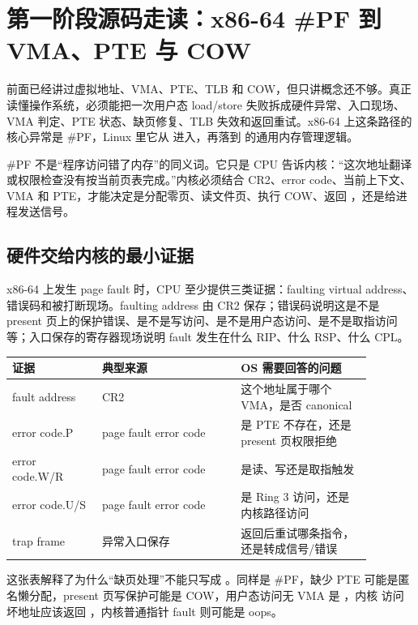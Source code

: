 \section{第一阶段源码走读：x86-64 \#PF 到 VMA、PTE 与 COW}

前面已经讲过虚拟地址、VMA、PTE、TLB 和 COW，但只讲概念还不够。真正读懂操作系统，必须能把一次用户态 load/store 失败拆成硬件异常、入口现场、VMA 判定、PTE 状态、缺页修复、TLB 失效和返回重试。x86-64 上这条路径的核心异常是 \#PF，Linux 里它从  进入，再落到  的通用内存管理逻辑。

\begin{keyidea}
\#PF 不是“程序访问错了内存”的同义词。它只是 CPU 告诉内核：“这次地址翻译或权限检查没有按当前页表完成。”内核必须结合 CR2、error code、当前上下文、VMA 和 PTE，才能决定是分配零页、读文件页、执行 COW、返回 ，还是给进程发送信号。
\end{keyidea}

\subsection{硬件交给内核的最小证据}

x86-64 上发生 page fault 时，CPU 至少提供三类证据：faulting virtual address、错误码和被打断现场。faulting address 由 CR2 保存；错误码说明这是不是 present 页上的保护错误、是不是写访问、是不是用户态访问、是不是取指访问等；入口保存的寄存器现场说明 fault 发生在什么 RIP、什么 RSP、什么 CPL。

\begin{longtable}{|p{0.22\linewidth}|p{0.34\linewidth}|p{0.32\linewidth}|}
\toprule
证据 & 典型来源 & OS 需要回答的问题 \\
\midrule
fault address & CR2 & 这个地址属于哪个 VMA，是否 canonical \\\tablerowrule
error code.P & page fault error code & 是 PTE 不存在，还是 present 页权限拒绝 \\\tablerowrule
error code.W/R & page fault error code & 是读、写还是取指触发 \\\tablerowrule
error code.U/S & page fault error code & 是 Ring 3 访问，还是内核路径访问 \\\tablerowrule
trap frame & 异常入口保存 & 返回后重试哪条指令，还是转成信号/错误 \\
\bottomrule
\end{longtable}

这张表解释了为什么“缺页处理”不能只写成 。同样是 \#PF，缺少 PTE 可能是匿名懒分配，present 页写保护可能是 COW，用户态访问无 VMA 是 ，内核  访问坏地址应该返回 ，内核普通指针 fault 则可能是 oops。

